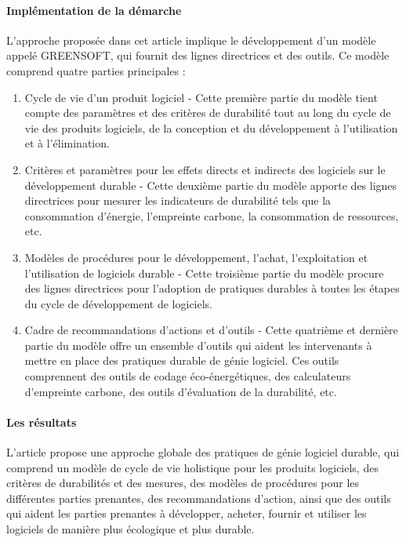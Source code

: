 \paragraph{Implémentation de la démarche}
L'approche proposée dans cet article implique le développement d'un modèle appelé GREENSOFT, qui fournit des lignes directrices et des outils. Ce modèle comprend quatre parties principales :
\begin{enumerate}
    \item Cycle de vie d'un produit logiciel - Cette première partie du modèle tient compte des paramètres et des critères de durabilité tout au long du cycle de vie des produits logiciels, de la conception et du développement à l'utilisation et à l'élimination.
    \item Critères et paramètres pour les effets directs et indirects des logiciels sur le développement durable - Cette deuxième partie du modèle apporte des lignes directrices pour mesurer les indicateurs de durabilité tels que la consommation d'énergie, l'empreinte carbone, la consommation de ressources, etc.
    \item Modèles de procédures pour le développement, l'achat, l'exploitation et l'utilisation de logiciels durable - Cette troisième partie du modèle procure des lignes directrices pour l'adoption de pratiques durables à toutes les étapes du cycle de développement de logiciels.
    \item Cadre de recommandations d'actions et d'outils - Cette quatrième et dernière partie du modèle offre un ensemble d'outils qui aident les intervenants à mettre en place des pratiques durable de génie logiciel. Ces outils comprennent des outils de codage éco-énergétiques, des calculateurs d'empreinte carbone, des outils d'évaluation de la durabilité, etc.
\end{enumerate}

\paragraph{Les résultats}
L'article propose une approche globale des pratiques de génie logiciel durable, qui comprend un modèle de cycle de vie holistique pour les produits logiciels, des critères de durabilités et des mesures, des modèles de procédures pour les différentes parties prenantes, des recommandations d'action, ainsi que des outils qui aident les parties prenantes à développer, acheter, fournir et utiliser les logiciels de manière plus écologique et plus durable.

